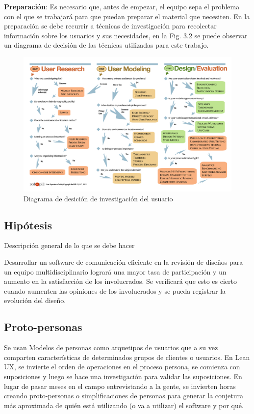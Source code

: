 \textbf{Preparación}: Es necesario que, antes de empezar, el equipo sepa el problema con el que se trabajará para que puedan preparar el material que necesiten. En la preparación se debe recurrir a técnicas de investigación para recolectar información sobre los usuarios y sus necesidades, en la Fig. 3.2 se puede observar un diagrama de decisión de las técnicas utilizadas para este trabajo.

\begin{figure}
\centering
\includegraphics[width=16cm]{Img/CPD/3-FLOW.png}
\caption[Diagrama de desición de investigación del usuario]{\label{us_figure} Diagrama de desición de investigación del usuario}
\end{figure}




\subsection{Hipótesis}
Descripción general de lo que se debe hacer

Desarrollar un software de comunicación eficiente en la revisión de diseños para un equipo multidisciplinario
logrará una mayor tasa de participación y un aumento en la satisfacción de los involucrados.
Se verificará que esto es cierto cuando aumenten las opiniones de los involucrados y se pueda registrar la evolución del diseño.


\subsection{Proto-personas}

Se usan Modelos de personas como arquetipos de usuarios que a su vez comparten  características de determinados grupos de clientes o usuarios.
En Lean UX, se invierte el orden de operaciones en el proceso persona, se comienza con suposiciones y luego se hace una investigación para validar las suposiciones. En lugar de pasar meses en el campo entrevistando a la gente, se invierten horas creando proto-personas o simplificaciones de personas para generar la conjetura más aproximada de quién está utilizando (o va a utilizar) el software y por qué. 


